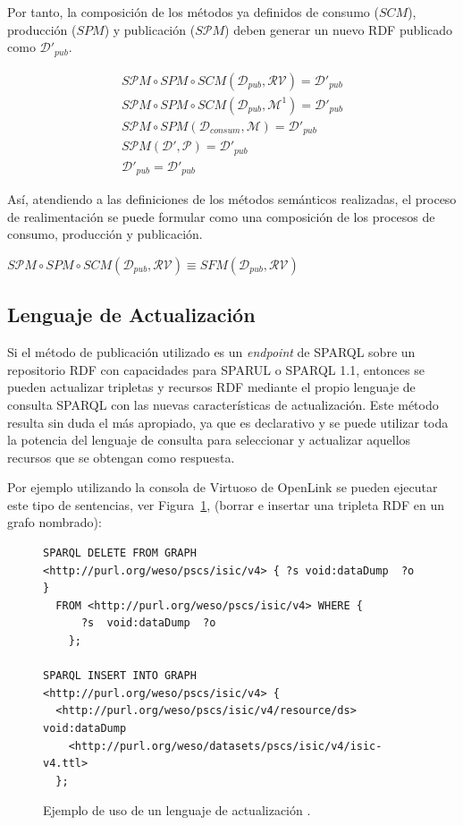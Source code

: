 Por tanto, la composición de los métodos ya definidos de consumo ($SCM$), producción ($SPM$) y publicación ($S\mathcal{P}M$) deben generar un
nuevo \dataset RDF publicado como $\mathcal{D}'_{pub}$.

\begin{align}
S\mathcal{P}M \circ SPM \circ SCM (\mathcal{D}_{pub}, \mathcal{RV}) = \mathcal{D}'_{pub} \\
S\mathcal{P}M \circ SPM \circ SCM (\mathcal{D}_{pub}, \mathcal{M}^1) = \mathcal{D}'_{pub} \\
S\mathcal{P}M \circ SPM (\mathcal{D}_{consum}, \mathcal{M}) = \mathcal{D}'_{pub} \\
S\mathcal{P}M (\mathcal{D}', \mathcal{P}) = \mathcal{D}'_{pub} \\
\mathcal{D}'_{pub} = \mathcal{D}'_{pub}
\end{align}

Así, atendiendo a las definiciones de los métodos semánticos realizadas, el proceso de realimentación
se puede formular como una composición de los procesos de consumo, producción y publicación.

\begin{center}
$S\mathcal{P}M \circ SPM \circ SCM (\mathcal{D}_{pub}, \mathcal{RV}) \equiv SFM (\mathcal{D}_{pub}, \mathcal{RV}) $
\end{center}

\subsection{Lenguaje de Actualización}\label{sect:sparul}
Si el método de publicación utilizado es un \textit{endpoint} de SPARQL sobre
un repositorio RDF con capacidades para \gls{SPARUL} o \gls{SPARQL} 1.1, entonces
se pueden actualizar tripletas y recursos RDF mediante el propio lenguaje
de consulta SPARQL con las nuevas características de actualización. Este método
resulta sin duda el más apropiado, ya que es declarativo y se puede utilizar
toda la potencia del lenguaje de consulta para seleccionar y actualizar
aquellos recursos que se obtengan como respuesta.

Por ejemplo utilizando la consola de Virtuoso de OpenLink se pueden ejecutar
este tipo de sentencias, ver Figura~\ref{fig:sparul}, (borrar e insertar una tripleta RDF 
en un grafo nombrado):

\begin{figure}[!htp]
\begin{lstlisting}
SPARQL DELETE FROM GRAPH <http://purl.org/weso/pscs/isic/v4> { ?s void:dataDump  ?o }  
  FROM <http://purl.org/weso/pscs/isic/v4> WHERE {  
      ?s  void:dataDump  ?o  
    };

SPARQL INSERT INTO GRAPH <http://purl.org/weso/pscs/isic/v4> { 
  <http://purl.org/weso/pscs/isic/v4/resource/ds> void:dataDump 
    <http://purl.org/weso/datasets/pscs/isic/v4/isic-v4.ttl> 
  };
\end{lstlisting}
	\caption{Ejemplo de uso de un lenguaje de actualización .}
	\label{fig:sparul}
\end{figure}


